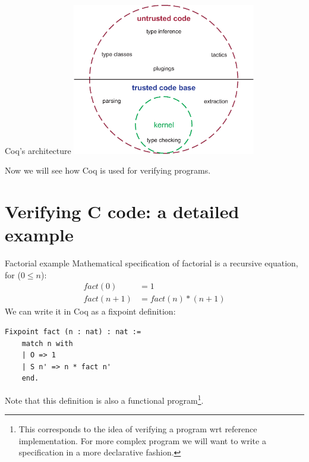 \documentclass[10pt]{beamer}
\begin{document}
\begin{frame}{Coq's architecture}
    \includegraphics[width=8cm]{pictures/circ.eps}
    \vfill
    {\hfill\cite{SozeauPic}}
\end{frame}

\begin{frame}
 Now we will see how Coq is used for verifying programs.
\end{frame}



\section{Verifying C code: a detailed example}


\begin{frame}[fragile]{Factorial example}
  Mathematical specification of factorial is a recursive equation, for ($0 \leq n$):\begin{align*}
  fact(0) &= 1 \\
  fact(n + 1) &= fact(n)*(n+1)    
  \end{align*}
  We can write it in Coq as a fixpoint definition:
  \begin{lstlisting}[language=Coq]
  Fixpoint fact (n : nat) : nat :=
    match n with
    | O => 1
    | S n' => n * fact n'
    end.
  \end{lstlisting}
  Note that this definition is also a functional program\footnote{This corresponds to the idea of verifying a program wrt reference implementation. For more complex program we will want to write a specification in a more declarative fashion.}.
 
\end{frame}
\end{document}
